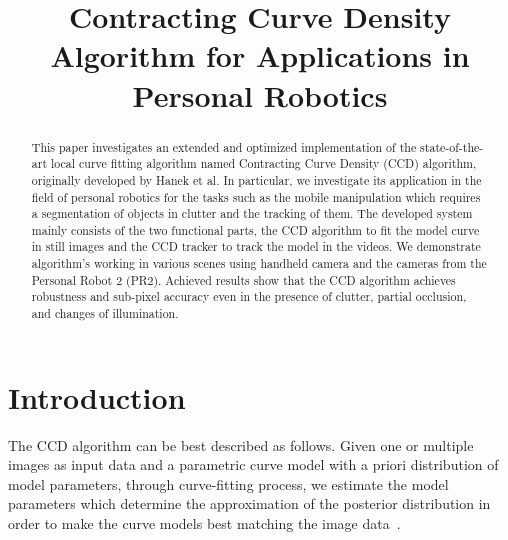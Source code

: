 \documentclass[conference]{IEEEtran}
\begin{document}
%
\title{Contracting Curve Density Algorithm for Applications in Personal Robotics}


\author{
}

\maketitle

\begin{abstract}
This paper investigates an extended and optimized
implementation of the state-of-the-art local curve fitting algorithm
named Contracting Curve Density (CCD) algorithm, originally developed 
by Hanek et al. In particular, we investigate its application  
in the field of personal robotics for the tasks such as the mobile
manipulation which requires a segmentation
of objects in clutter and the tracking of them. 
The developed system mainly consists of the two functional parts, the CCD
algorithm to fit the model curve in still images and the CCD tracker to
track the model in the videos. We demonstrate algorithm's working 
in various scenes using handheld camera and the cameras from the 
Personal Robot 2 (PR2). Achieved results show that the CCD algorithm achieves 
robustness and sub-pixel accuracy even in the presence of clutter, 
partial occlusion, and changes of illumination.
\end{abstract}

\IEEEpeerreviewmaketitle

\section{Introduction}
The CCD algorithm can be best described as follows. Given one or multiple images as input
data and a parametric curve model with a priori distribution of model
parameters, through curve-fitting process, we estimate the model
parameters which determine the approximation of the posterior
distribution in order to make the curve models best matching the image 
data~\cite{hanek2004contracting}.
\end{document}

